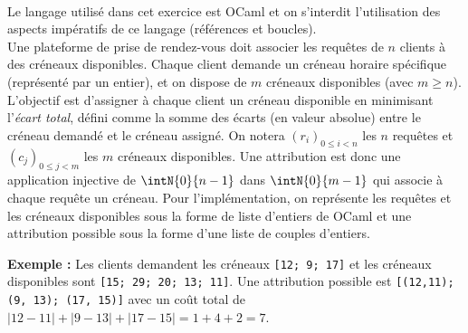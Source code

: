 \documentclass[11pt,a4paper]{article}
\begin{document}
\begin{Exercise}[title={Planification de rendez-vous optimale}]\\
    Le langage utilisé dans cet exercice est OCaml et on s'interdit l'utilisation des aspects impératifs de ce langage (références et boucles). \smallskip{} \\
    Une plateforme de prise de rendez-vous doit associer les requêtes de $n$ clients à des créneaux disponibles. Chaque client demande un créneau horaire spécifique (représenté par un entier), et on dispose de $m$ créneaux disponibles (avec $m \geqslant n$). L'objectif est d'assigner à chaque client un créneau disponible en minimisant l'\textit{écart total}, défini comme la somme des écarts (en valeur absolue) entre le créneau demandé et le créneau assigné. On notera $(r_i)_{0 \leqslant i < n}$ les $n$ requêtes et $(c_j)_{0 \leqslant j < m}$ les $m$ créneaux disponibles. Une attribution est donc une application injective de $\intN{0}{n-1}$ dans $\intN{0}{m-1}$ qui associe à chaque requête un créneau. Pour l'implémentation, on représente les requêtes et les créneaux disponibles sous la forme de liste d'entiers de OCaml et une attribution possible sous la forme d'une liste de couples d'entiers. 
    
    \textbf{Exemple :} Les clients demandent les créneaux {\tt [12; 9; 17]} et les créneaux disponibles sont {\tt [15; 29; 20; 13; 11]}. Une attribution possible est {\tt [(12,11); (9, 13); (17, 15)]} avec un coût total de $|12-11| + |9-13| + |17-15| = 1+4+2 = 7$. \\
    

\end{Exercise}
\end{document}
